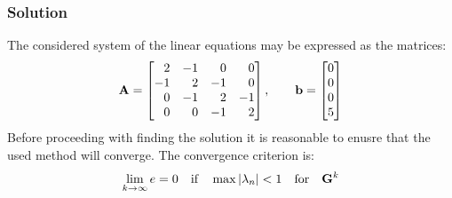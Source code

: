 \subsubsection*{Solution}
The considered system of the linear equations may be expressed as the matrices:
\begin{equation*}
  \mathbf{A} = \begin{bmatrix}
    \phantom{-}2 & -1 & \phantom{-}0 & \phantom{-}0 \\
    -1 & \phantom{-}2 & -1 & \phantom{-}0 \\
    \phantom{-}0 & -1 & \phantom{-}2 & -1 \\
    \phantom{-}0 & \phantom{-}0 & -1 & \phantom{-}2
  \end{bmatrix}, \qquad
  \mathbf{b} = \begin{bmatrix}
    0 \\
    0 \\
    0 \\
    5
  \end{bmatrix}
\end{equation*}
Before proceeding with finding the solution it is reasonable to enusre that the used
method will converge. The convergence criterion is:
\begin{equation*}
  \lim_{k\to\infty}{e} = 0
  \quad \text{if} \quad
  \max{\lvert\lambda_n\rvert}<1
  \quad \text{for} \quad
  \mathbf{G}^{k}
\end{equation*}


